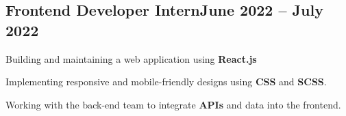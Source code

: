 \subsection{{Frontend Developer Intern\hfill June 2022 -- July 2022}}
\begin{zitemize}
\item Building and maintaining a web application using \textbf{React.js}
\item Implementing responsive and mobile-friendly designs using \textbf{CSS} and \textbf{SCSS}.
\item Working with the back-end team to integrate \textbf{APIs} and data into the frontend.


\end{zitemize}
